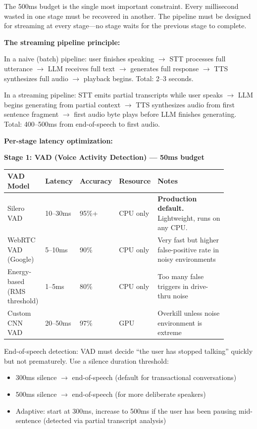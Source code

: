 The 500ms budget is the single most important constraint. Every millisecond wasted in one stage must be recovered in another. The pipeline must be designed for streaming at every stage---no stage waits for the previous stage to complete.

\textbf{The streaming pipeline principle:}

In a naive (batch) pipeline: user finishes speaking $\rightarrow$ STT processes full utterance $\rightarrow$ LLM receives full text $\rightarrow$ generates full response $\rightarrow$ TTS synthesizes full audio $\rightarrow$ playback begins. Total: 2--3 seconds.

In a streaming pipeline: STT emits partial transcripts while user speaks $\rightarrow$ LLM begins generating from partial context $\rightarrow$ TTS synthesizes audio from first sentence fragment $\rightarrow$ first audio byte plays before LLM finishes generating. Total: 400--500ms from end-of-speech to first audio.

\textbf{Per-stage latency optimization:}

\textbf{Stage 1: VAD (Voice Activity Detection) --- 50ms budget}

\begin{tabular}{|p{0.15\linewidth}|p{0.08\linewidth}|p{0.08\linewidth}|p{0.1\linewidth}|p{0.47\linewidth}|}
\hline
\textbf{VAD Model} & \textbf{Latency} & \textbf{Accuracy} & \textbf{Resource} & \textbf{Notes} \\
\hline
Silero VAD & 10--30ms & 95\%+ & CPU only & \textbf{Production default.} Lightweight, runs on any CPU. \\
\hline
WebRTC VAD (Google) & 5--10ms & 90\% & CPU only & Very fast but higher false-positive rate in noisy environments \\
\hline
Energy-based (RMS threshold) & 1--5ms & 80\% & CPU only & Too many false triggers in drive-thru noise \\
\hline
Custom CNN VAD & 20--50ms & 97\% & GPU & Overkill unless noise environment is extreme \\
\hline
\end{tabular}

\bigskip
End-of-speech detection: VAD must decide ``the user has stopped talking'' quickly but not prematurely. Use a silence duration threshold:
\begin{itemize}
  \item 300ms silence $\rightarrow$ end-of-speech (default for transactional conversations)
  \item 500ms silence $\rightarrow$ end-of-speech (for more deliberate speakers)
  \item Adaptive: start at 300ms, increase to 500ms if the user has been pausing mid-sentence (detected via partial transcript analysis)
\end{itemize}

